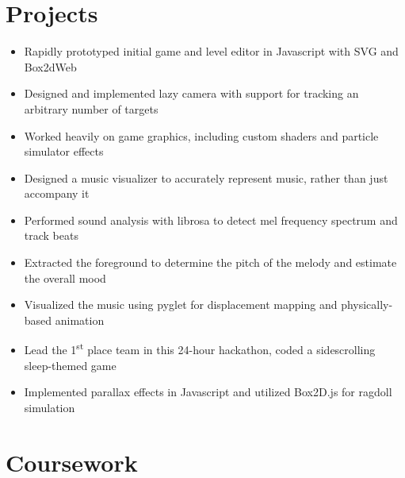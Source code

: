 \documentclass{zres}
\begin{document}
\begin{resume}
\section{Projects}

\begin{itemize}[leftmargin=10pt]
  \item Rapidly prototyped initial game and level editor in Javascript with SVG and Box2dWeb
  \item Designed and implemented lazy camera with support for tracking an arbitrary number of targets
  \item Worked heavily on game graphics, including custom shaders and particle simulator effects
\end{itemize}

\begin{itemize}[leftmargin=10pt]
  \item Designed a music visualizer to accurately represent music, rather than just accompany it
  \item Performed sound analysis with librosa to detect mel frequency spectrum and track beats
  \item Extracted the foreground to determine the pitch of the melody and estimate the overall mood
  \item Visualized the music using pyglet for displacement mapping and physically-based animation
\end{itemize}

\begin{itemize}[leftmargin=10pt]
  \item Lead the 1\textsuperscript{st} place team in this 24-hour hackathon, coded a sidescrolling sleep-themed game
  \item Implemented parallax effects in Javascript and utilized Box2D.js for ragdoll simulation
\end{itemize}

\section{Coursework}

\\
\\


\end{resume}
\end{document}
